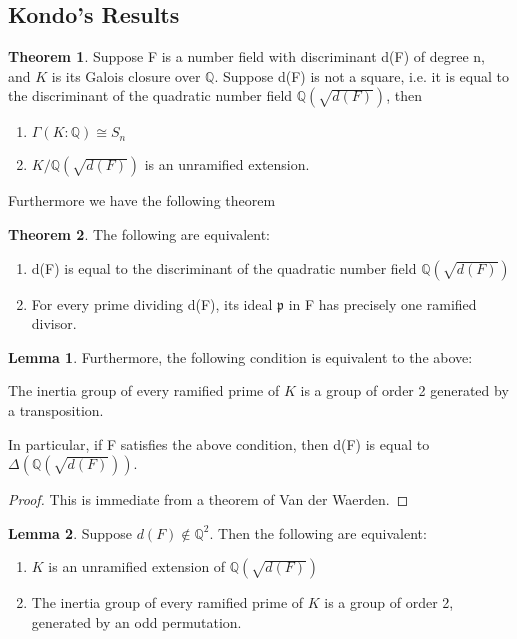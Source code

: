 \documentclass[12pt]{extarticle}
\newcommand{\<}{\langle}
\renewcommand{\>}{\rangle}
\theoremstyle{definition}
\newtheorem{theorem}{Theorem}
\newtheorem{lemma}{Lemma}
\begin{document}
\subsection{Kondo's Results}
\begin{theorem}
    Suppose F is a number field with discriminant d(F) of degree n, and $K$ is its Galois closure over $\mathbb{Q}$. Suppose d(F) is not a square, i.e. it is equal to the discriminant of the quadratic number field $\mathbb{Q}(\sqrt{d(F)})$, then \begin{enumerate}
        \item $\Gamma(K:\mathbb{Q})\cong S_n$
        \item $K/\mathbb{Q}(\sqrt{d(F)})$ is an unramified extension.
    \end{enumerate}
\end{theorem}
Furthermore we have the following theorem \begin{theorem}
    The following are equivalent: \begin{enumerate}
        \item d(F) is equal to the discriminant of the quadratic number field $\mathbb{Q}(\sqrt{d(F)})$
        \item For every prime dividing d(F), its ideal $\mathfrak{p}$ in F has precisely one ramified divisor.
    \end{enumerate}
\end{theorem}
\begin{lemma}
Furthermore, the following condition is equivalent to the above:
\par
    The inertia group of every ramified prime of $K$ is a group of order 2 generated by a transposition.\par
In particular, if F satisfies the above condition, then d(F) is equal to $\Delta(\mathbb{Q}(\sqrt{d(F)}))$.
\end{lemma}
\begin{proof}
This is immediate from a theorem of Van der Waerden. 
\end{proof}
\begin{lemma}
Suppose $d(F)\notin \mathbb{Q}^2$. Then the following are equivalent:\begin{enumerate}
    \item $K$ is an unramified extension of $\mathbb{Q}(\sqrt{d(F)})$
    \item The inertia group of every ramified prime of $K$ is a group of order 2, generated by an odd permutation. 
\end{enumerate}
\end{lemma} 
\end{document}
